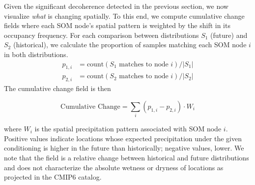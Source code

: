 Given the significant decoherence detected in the previous section, we now visualize \textit{what} is changing spatially.
%
To this end, we compute cumulative change fields where each SOM node's spatial pattern is weighted by the shift in its occupancy frequency.
%
For each comparison between distributions $S_1$ (future) and $S_2$ (historical), we calculate the proportion of samples matching each SOM node $i$ in both distributions. 
\begin{align*}
    p_{1,i} &= \text{count}(S_1 \text{ matches to node } i)/|S_1| \\
    p_{2,i} &= \text{count}(S_2 \text{ matches to node } i)/|S_2|
\end{align*}
The cumulative change field is then
\begin{linenomath*}
\begin{equation*}
    \text{Cumulative Change} = \sum_{i} (p_{1,i} - p_{2,i}) \cdot W_i
\end{equation*}
\end{linenomath*}
where $W_i$ is the spatial precipitation pattern associated with SOM node $i$.
%
Positive values indicate locations whose expected precipitation under the given conditioning is higher in the future than historically; negative values, lower.
%
We note that the field is a relative change between historical and future distributions and does not characterize the absolute wetness or dryness of locations as projected in the CMIP6 catalog.



